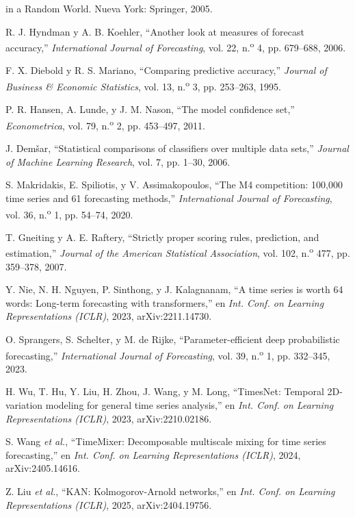 \documentclass[12pt,letterpaper]{report}
\begin{document}
\begin{enumerate}[label={[\arabic*]}, leftmargin=*, itemsep=2pt]
{in a Random World}. Nueva York: Springer, 2005.
\item\label{bib:44} R. J. Hyndman y A. B. Koehler, ``Another look at measures of
forecast accuracy,'' \textit{International Journal of Forecasting}, vol. 22,
n.\textsuperscript{o} 4, pp. 679--688, 2006.
\item\label{bib:45} F. X. Diebold y R. S. Mariano, ``Comparing predictive
accuracy,'' \textit{Journal of Business \& Economic Statistics}, vol. 13,
n.\textsuperscript{o} 3, pp. 253--263, 1995.
\item\label{bib:46} P. R. Hansen, A. Lunde, y J. M. Nason, ``The model confidence
set,'' \textit{Econometrica}, vol. 79, n.\textsuperscript{o} 2, pp. 453--497, 2011.
\item\label{bib:47} J. Dem\v{s}ar, ``Statistical comparisons of classifiers over
multiple data sets,'' \textit{Journal of Machine Learning Research}, vol. 7,
pp. 1--30, 2006.
\item\label{bib:48} S. Makridakis, E. Spiliotis, y V. Assimakopoulos, ``The M4
competition: 100,000 time series and 61 forecasting methods,'' \textit{International
Journal of Forecasting}, vol. 36, n.\textsuperscript{o} 1, pp. 54--74, 2020.
\item\label{bib:49} T. Gneiting y A. E. Raftery, ``Strictly proper scoring rules,
prediction, and estimation,'' \textit{Journal of the American Statistical Association},
vol. 102, n.\textsuperscript{o} 477, pp. 359--378, 2007.
\item\label{bib:50} Y. Nie, N. H. Nguyen, P. Sinthong, y J. Kalagnanam, ``A time series is worth 64 words: Long-term forecasting with transformers,'' en \textit{Int. Conf. on Learning Representations (ICLR)}, 2023, arXiv:2211.14730.
\item\label{bib:51} O. Sprangers, S. Schelter, y M. de Rijke, ``Parameter-efficient deep probabilistic forecasting,'' \textit{International Journal of Forecasting}, vol. 39, n.\textsuperscript{o} 1, pp. 332--345, 2023.
\item\label{bib:52} H. Wu, T. Hu, Y. Liu, H. Zhou, J. Wang, y M. Long, ``TimesNet: Temporal 2D-variation modeling for general time series analysis,'' en \textit{Int. Conf. on Learning Representations (ICLR)}, 2023, arXiv:2210.02186.
\item\label{bib:53} S. Wang \textit{et al.}, ``TimeMixer: Decomposable multiscale mixing for time series forecasting,'' en \textit{Int. Conf. on Learning Representations (ICLR)}, 2024, arXiv:2405.14616.
\item\label{bib:54} Z. Liu \textit{et al.}, ``KAN: Kolmogorov-Arnold networks,'' en \textit{Int. Conf. on Learning Representations (ICLR)}, 2025, arXiv:2404.19756.

\end{enumerate}
\end{document}
